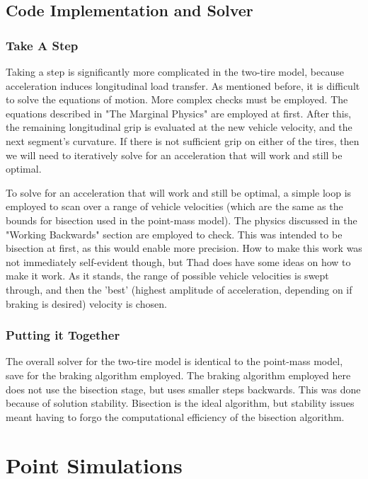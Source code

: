\documentclass{article}
\begin{document}
\subsection{Code Implementation and Solver}

\subsubsection{Take A Step}

Taking a step is significantly more complicated in the two-tire model, because acceleration induces longitudinal load transfer. As mentioned before, it is difficult to solve the equations of motion. More complex checks must be employed. The equations described in "The Marginal Physics" are employed at first. After this, the remaining longitudinal grip is evaluated at the new vehicle velocity, and the next segment's curvature. If there is not sufficient grip on either of the tires, then we will need to iteratively solve for an acceleration that will work and still be optimal.

To solve for an acceleration that will work and still be optimal, a simple loop is employed to scan over a range of vehicle velocities (which are the same as the bounds for bisection used in the point-mass model). The physics discussed in the "Working Backwards" section are employed to check. This was intended to be bisection at first, as this would enable more precision. How to make this work was not immediately self-evident though, but Thad does have some ideas on how to make it work. As it stands, the range of possible vehicle velocities is swept through, and then the 'best' (highest amplitude of acceleration, depending on if braking is desired) velocity is chosen.

\subsubsection{Putting it Together}

The overall solver for the two-tire model is identical to the point-mass model, save for the braking algorithm employed. The braking algorithm employed here does not use the bisection stage, but uses smaller steps backwards. This was done because of solution stability. Bisection is the ideal algorithm, but stability issues meant having to forgo the computational efficiency of the bisection algorithm.

\section{Point Simulations}
\end{document}
